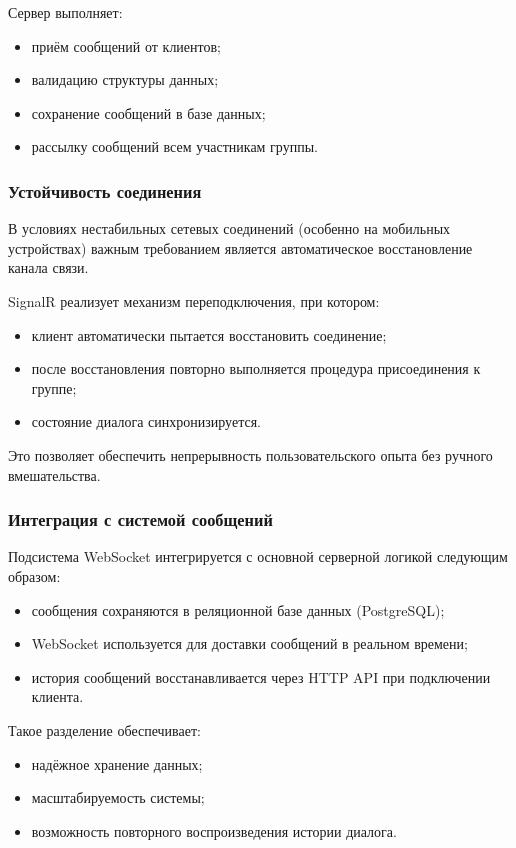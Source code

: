\documentclass{article}
\begin{document}
Сервер выполняет:
\begin{itemize}
\item приём сообщений от клиентов;
\item валидацию структуры данных;
\item сохранение сообщений в базе данных;
\item рассылку сообщений всем участникам группы.
\end{itemize}

\subsubsection{Устойчивость соединения}

В условиях нестабильных сетевых соединений (особенно на мобильных устройствах) важным требованием является автоматическое восстановление канала связи.

SignalR реализует механизм переподключения, при котором:
\begin{itemize}
\item клиент автоматически пытается восстановить соединение;
\item после восстановления повторно выполняется процедура присоединения к группе;
\item состояние диалога синхронизируется.
\end{itemize}

Это позволяет обеспечить непрерывность пользовательского опыта без ручного вмешательства.

\subsubsection{Интеграция с системой сообщений}

Подсистема WebSocket интегрируется с основной серверной логикой следующим образом:
\begin{itemize}
\item сообщения сохраняются в реляционной базе данных (PostgreSQL);
\item WebSocket используется для доставки сообщений в реальном времени;
\item история сообщений восстанавливается через HTTP API при подключении клиента.
\end{itemize}

Такое разделение обеспечивает:
\begin{itemize}
\item надёжное хранение данных;
\item масштабируемость системы;
\item возможность повторного воспроизведения истории диалога.
\end{itemize}
\end{document}
